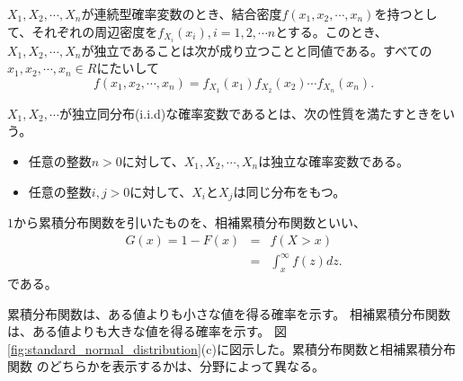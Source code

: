\begin{theo}
 $X_1,X_2,\cdots,X_n$が連続型確率変数のとき、結合密度$f(x_1,x_2,\cdots,x_n)$を持つとして、それぞれの周辺密度を$f_{X_i}(x_i),i=1,2,\cdots n$とする。このとき、$X_1,X_2,\cdots,X_n$が独立であることは次が成り立つことと同値である。すべての$x_1,x_2,\cdots, x_n \in R$にたいして
 \begin{equation*}
  f(x_1,x_2,\cdots,x_n) = f_{X_1}(x_1)f_{X_2}(x_2)\cdots f_{X_n}(x_n).
 \end{equation*}
\end{theo}


\begin{defi}
 $X_1,X_2,\cdots$が独立同分布(i.i.d)な確率変数であるとは、次の性質を満たすときをいう。
 \begin{itemize}
  \item 任意の整数$n>0$に対して、$X_1,X_2,\cdots,X_n$は独立な確率変数である。
  \item 任意の整数$i,j>0$に対して、$X_i$と$X_j$は同じ分布をもつ。
 \end{itemize}
\end{defi}


\begin{defi}
 $1$から累積分布関数を引いたものを、相補累積分布関数といい、
 \begin{eqnarray}
  G(x)=1-F(x) &=& f(X>x) \\
  &=& \int_{x}^{\infty} f(z)dz.
 \end{eqnarray}
 である。
\end{defi}
累積分布関数は、ある値よりも小さな値を得る確率を示す。
相補累積分布関数は、ある値よりも大きな値を得る確率を示す。
図\ref{fig:standard_normal_distribution}(c)に図示した。累積分布関数と相補累積分布関数
のどちらかを表示するかは、分野によって異なる。

